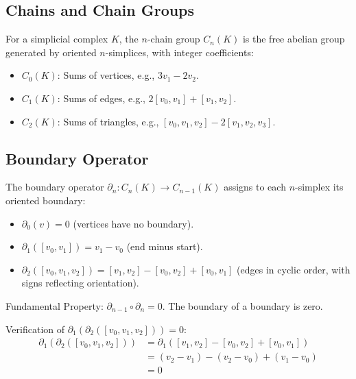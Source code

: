 \subsection{Chains and Chain Groups}

\begin{definition}
For a simplicial complex $K$, the $n$-chain group $C_n(K)$ is the free abelian group generated by oriented $n$-simplices, with integer coefficients:
\begin{itemize}
    \item $C_0(K)$: Sums of vertices, e.g., $3v_1 - 2v_2$.
    \item $C_1(K)$: Sums of edges, e.g., $2[v_0, v_1] + [v_1, v_2]$.
    \item $C_2(K)$: Sums of triangles, e.g., $[v_0, v_1, v_2] - 2[v_1, v_2, v_3]$.
\end{itemize}
\end{definition}

\subsection{Boundary Operator}

\begin{definition}
The boundary operator $\partial_n: C_n(K) \to C_{n-1}(K)$ assigns to each $n$-simplex its oriented boundary:
\begin{itemize}
    \item $\partial_0(v) = 0$ (vertices have no boundary).
    \item $\partial_1([v_0, v_1]) = v_1 - v_0$ (end minus start).
    \item $\partial_2([v_0, v_1, v_2]) = [v_1, v_2] - [v_0, v_2] + [v_0, v_1]$ (edges in cyclic order, with signs reflecting orientation).
\end{itemize}
\end{definition}

\begin{theorem}
Fundamental Property: $\partial_{n-1} \circ \partial_n = 0$. The boundary of a boundary is zero.
\end{theorem}

\begin{example}
Verification of $\partial_1(\partial_2([v_0,v_1,v_2])) = 0$:
\begin{align*}
\partial_1(\partial_2([v_0,v_1,v_2])) &= \partial_1([v_1,v_2] - [v_0,v_2] + [v_0,v_1]) \\
&= (v_2 - v_1) - (v_2 - v_0) + (v_1 - v_0) \\
&= 0
\end{align*}
\end{example}


